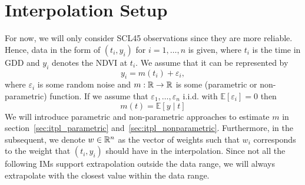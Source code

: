 \section{Interpolation Setup}{\label{sec:itpl_setup}
	For now, we will only consider SCL45 observations since they are more reliable. Hence, data in the form of $\left(t_{i}, y_{i}\right)$ for $i=1, \ldots, n$ is given, where $t_i$ is the time in GDD and $y_i$ denotes the NDVI at $t_i$. We assume that it can be represented by
	$$
		y_{i}=m\left(t_{i}\right)+\varepsilon_{i},
	$$
	where $\varepsilon_i$ is some random noise and $m: \mathbb{R} \rightarrow \mathbb{R}$ is some (parametric or non-parametric) function. If we assume that $\varepsilon_{1}, \ldots, \varepsilon_{n}$ i.i.d. with $\mathbb{E}\left[\varepsilon_{i}\right]=0$ then 
	$$
		m(t)=\mathbb{E}[y \mid t]
	$$
	We will introduce parametric and non-parametric approaches to estimate $m$ in section~\ref{sec:itpl_parametric} and~\ref{sec:itpl_nonparametric}.
	Furthermore, in the subsequent, we denote $w\in \mathbb{R}^n$ as the vector of weights such that $w_i$ corresponds to the weight that $(t_i, y_i)$ should have in the interpolation. Since not all the following IMs support extrapolation outside the data range, we will always extrapolate with the closest value within the data range. 
}







